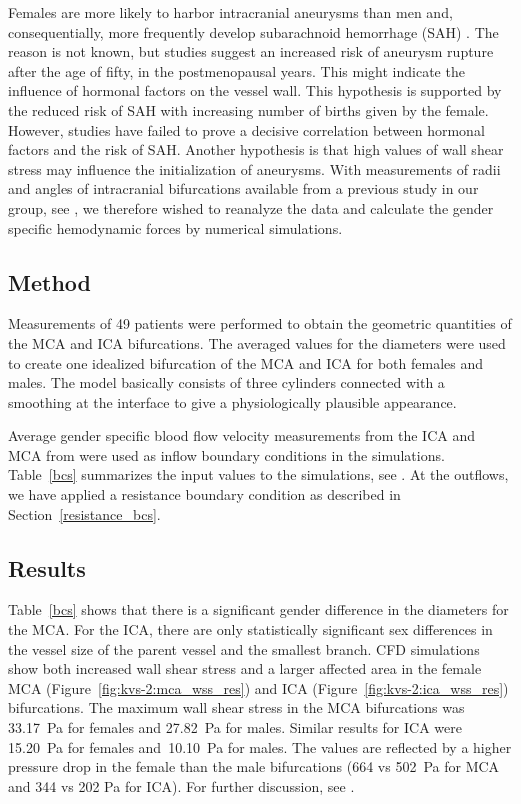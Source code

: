 Females are more likely to harbor intracranial aneurysms than men and,
consequentially, more frequently develop subarachnoid hemorrhage
(SAH) \citep{EdenMeurerSanchezEtAl2008}. The reason is not known, but
studies suggest an increased risk of aneurysm rupture after the age of
fifty, in the postmenopausal years. This might indicate the influence
of hormonal factors on the vessel wall. This hypothesis is supported
by the reduced risk of SAH with increasing number of
births given by the female. However, studies
have failed to prove a decisive correlation between hormonal factors
and the risk of SAH. Another hypothesis is that high values of wall
shear stress may influence the initialization of aneurysms. With
measurements of radii and angles of intracranial bifurcations
available from a previous study in our group,
see \citet{IngebrigtsenMorganFaulderEtAl2004}, we therefore wished to
reanalyze the data and calculate the gender specific hemodynamic
forces by numerical simulations.

\subsection{Method}

Measurements of 49 patients were performed to obtain the geometric
quantities of the MCA and ICA bifurcations. The averaged values for
the diameters were used to create one idealized bifurcation of the MCA
and ICA for both females and males. The model basically consists of
three cylinders connected with a smoothing at the interface to give a
physiologically plausible appearance.

Average gender specific blood flow velocity measurements from the ICA
and MCA from \citet{KrejzaSzydlikLiebeskindEtAl2005} were used as
inflow boundary conditions in the simulations. Table~\ref{bcs}
summarizes the input values to the simulations,
see \citet{LindekleivValen-SendstadMorganEtAl2010}.  At the outflows,
we have applied a resistance boundary condition as described in
Section~\ref{resistance_bcs}.

\subsection{Results}

Table~\ref{bcs} shows that there is a significant gender difference in
the diameters for the MCA. For the ICA, there are only statistically
significant sex differences in the vessel size of the parent vessel
and the smallest branch. CFD simulations show both increased wall
shear stress and a larger affected area in the female MCA
(Figure~\ref{fig:kvs-2:mca_wss_res}) and ICA
(Figure~\ref{fig:kvs-2:ica_wss_res}) bifurcations. The maximum wall
shear stress in the MCA bifurcations was 33.17~Pa for females and
27.82~Pa for males. Similar results for ICA were 15.20~Pa for females
and~10.10~Pa for males. The values are reflected by a higher pressure
drop in the female than the male bifurcations (664 vs 502~Pa for MCA
and 344 vs 202 Pa for ICA). For further discussion,
see \citet{LindekleivValen-SendstadMorganEtAl2010}.

